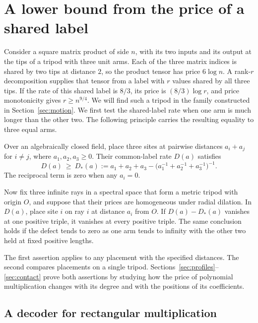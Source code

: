 \section{A lower bound from the price of a shared label}\label{sec:boundary}

Consider a square matrix product of side \(n\), with its two inputs
and its output at the tips of a tripod with three unit arms. Each of
the three matrix indices is shared by two tips at distance \(2\), so
the product tensor has price \(6\log n\). A rank-\(r\) decomposition
supplies that tensor from a label with \(r\) values shared by all
three tips. If the rate of this shared label is \(8/3\), its price is
\((8/3)\log r\), and price monotonicity gives \(r\ge n^{9/4}\).
We will find such a tripod in the family constructed in
Section~\ref{sec:motion}. We first test the shared-label rate when one
arm is much longer than the other two. The following principle carries
the resulting equality to three equal arms.

\begin{proposition}\label{prop:tripod}
Over an algebraically closed field, place three sites at pairwise
distances \(a_i+a_j\) for \(i\ne j\), where \(a_1,a_2,a_3\ge0\).
Their common-label rate \(D(a)\) satisfies
\[
       D(a)\ \ge\ D_*(a)
       :=a_1+a_2+a_3-\bigl(a_1^{-1}+a_2^{-1}+a_3^{-1}\bigr)^{-1}.
\]
The reciprocal term is zero when any \(a_i=0\).

Now fix three infinite rays in a spectral space that form a metric
tripod with origin \(O\), and suppose that their prices are
homogeneous under radial dilation. In \(D(a)\), place site \(i\) on
ray \(i\) at distance \(a_i\) from \(O\). If \(D(a)-D_*(a)\)
vanishes at one positive triple, it vanishes at every positive
triple. The same conclusion holds if the defect tends to zero as one
arm tends to infinity with the other two held at fixed positive lengths.
\end{proposition}

The first assertion applies to any placement with the specified
distances. The second compares placements on a single tripod.
Sections~\ref{sec:profiles}--\ref{sec:contact} prove both assertions by
studying how the price of polynomial multiplication changes with its
degree and with the positions of its coefficients.

\subsection{A decoder for rectangular multiplication}

